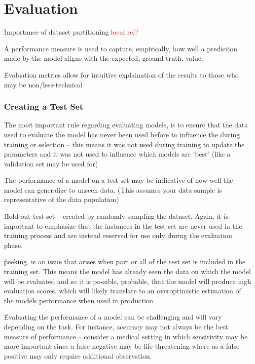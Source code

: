 \chapter{Evaluation}

\r{Importance of dataset partitioning \textcolor{red}{local ref?}}


\r{A performance measure is used to capture, empirically, how well a prediction made by the model aligns with the expected, ground truth, value.}

\r{Evaluation metrics allow for intuitive explaination of the results to those who may be non/less-technical}

\subsection{Creating a Test Set}

\r{The most important rule regarding evaluating models, is to ensure that the data used to evaluate the model has never been used before to influence the during training or selection -- this means it was not used during training to update the parameters and it was not used to influence which models are `best' (like a validation set may be used for)}

\r{The performance of a model on a test set may be indicative of how well the model can generalize to unseen data. (This assumes your data sample is representative of the data population)}

\r{Hold-out test set -- created by randomly sampling the dataset. Again, it is important to emphasize that the instances in the test set are never used in the training process and are instead reserved for use only during the evaluation phase.}

\r{peeking, is an issue that arises when part or all of the test set is included in the training set. This means the model has already seen the data on which the model will be evaluated and so it is possible, probable, that the model will produce high evaluation scores, which will likely translate to an overoptimistic estimation of the models performance when used in production.}

\r{Evaluating the performance of a model can be challenging and will vary depending on the task. For instance, accuracy may not always be the best measure of performance -- consider a medical setting in which sensitivity may be more important since a false negative may be life threatening where as a false positive may only require additional observation.}

